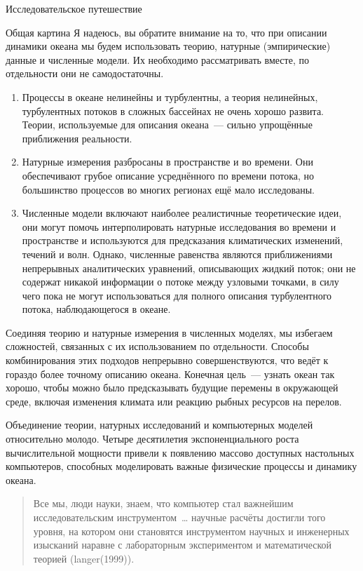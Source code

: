 \begin{chapter}{Исследовательское путешествие}
\begin{section}{Общая картина}
Я надеюсь, вы обратите внимание на то, что при описании динамики океана мы 
будем использовать теорию, натурные (эмпирические) данные и численные модели. 
Их необходимо рассматривать вместе, по отдельности они не самодостаточны.

\begin{enumerate}
\item
Процессы в океане нелинейны и турбулентны, а теория нелинейных, турбулентных 
потоков в сложных бассейнах не очень хорошо развита. Теории, используемые 
для описания океана~--- сильно упрощённые приближения реальности. 

\item
Натурные измерения разбросаны в пространстве и во времени. Они обеспечивают 
грубое описание усреднённого по времени потока, но большинство процессов 
во многих регионах ещё мало исследованы. 

\item
Численные модели включают наиболее реалистичные теоретические идеи, они могут 
помочь интерполировать натурные исследования во времени и пространстве 
и используются для предсказания климатических изменений, течений и волн. 
Однако, численные равенства являются приближениями непрерывных аналитических 
уравнений, описывающих жидкий поток; они не содержат никакой информации о 
потоке между узловыми точками, в силу чего пока не могут использоваться 
для полного описания турбулентного потока, наблюдающегося в океане. 
\end{enumerate}

Соединяя теорию и натурные измерения в численных моделях, мы избегаем 
сложностей, связанных с их использованием по отдельности. Способы комбинирования
этих подходов непрерывно совершенствуются, что ведёт к гораздо 
более точному описанию океана. Конечная цель~--- узнать океан так хорошо, 
чтобы можно было предсказывать будущие перемены в окружающей среде, 
включая изменения климата или реакцию рыбных ресурсов на перелов.

Объединение теории, натурных исследований и компьютерных моделей относительно 
молодо. Четыре десятилетия экспоненциального роста вычислительной мощности
привели к появлению массово доступных настольных компьютеров, способных 
моделировать важные физические процессы и динамику океана.

\begin{quotation}
Все мы, люди науки, знаем, что компьютер стал важнейшим исследовательским 
инструментом~\dots{} научные расчёты достигли того уровня, на котором 
они становятся инструментом научных и инженерных изысканий наравне
с лабораторным экспериментом и математической теорией (langer(1999)).
\end{quotation}



\end{section}
\end{chapter}
